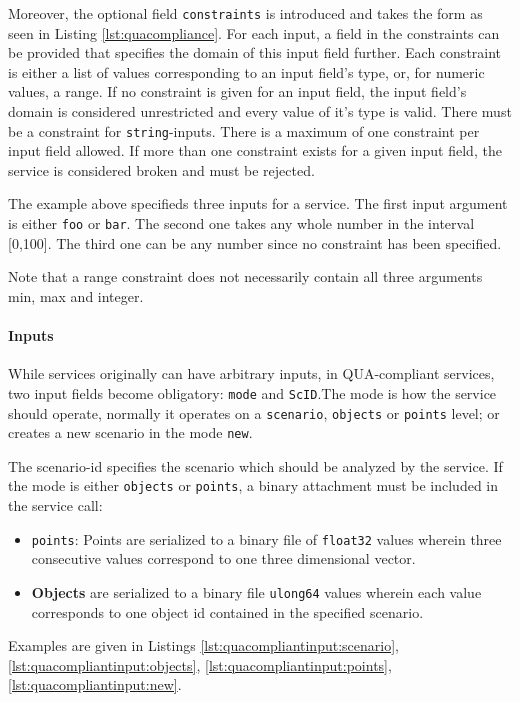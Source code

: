 Moreover, the optional field \texttt{constraints} is introduced and takes the form as seen in Listing \ref{lst:quacompliance}.
For each input, a field in the constraints can be provided that specifies the domain of this input field further. Each constraint is either a list of values corresponding to an input field's type, or, for numeric values, a range. If no constraint is given for an input field, the input field's domain is considered unrestricted and every value of it's type is valid. There must be a constraint for \texttt{string}-inputs. There is a maximum of one constraint per input field allowed. If more than one constraint exists for a given input field, the service is considered broken and must be rejected.

The example above specifieds three inputs for a service. The first input argument is either \texttt{foo} or \texttt{bar}. The second one takes any whole number in the interval [0,100]. The third one can be any number since no constraint has been specified.

Note that a range constraint does not necessarily contain all three arguments min, max and integer.

\paragraph{Inputs}
While services originally can have arbitrary inputs, in QUA-compliant services, two input fields become obligatory: \texttt{mode} and \texttt{ScID}.The mode is how the service should operate, normally it operates on a \texttt{scenario}, \texttt{objects} or \texttt{points} level; or creates a new scenario in the mode \texttt{new}.

The scenario-id specifies the scenario which should be analyzed by the service. If the mode is either \texttt{objects} or \texttt{points}, a binary attachment must be included in the service call:
\begin{itemize}
  \item \texttt{points}: Points are serialized to a binary file of \texttt{float32} values wherein three consecutive values correspond to one three dimensional vector.
  \item \textbf{Objects} are serialized to a binary file \texttt{ulong64} values wherein each value corresponds to one object id contained in the specified scenario.
\end{itemize}

Examples are given in Listings \ref{lst:quacompliantinput:scenario}, \ref{lst:quacompliantinput:objects}, \ref{lst:quacompliantinput:points}, \ref{lst:quacompliantinput:new}.

